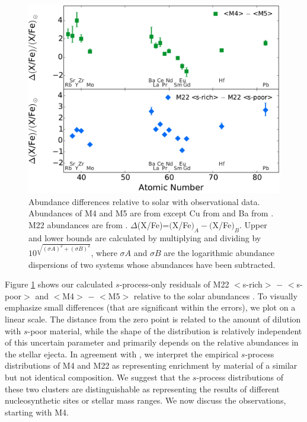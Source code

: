 \begin{figure}
 \begin{center}\includegraphics[width=\textwidth]{f3.pdf}\end{center}
 \caption{Abundance differences relative to solar with observational data. Abundances of M4 and M5 are from \citet{Yong:2008in,Yong:2008ib} except Cu from \citet{Simmerer:2003kg} and Ba from \citet{Ivans:2001ju}. M22 abundances are from \citet{Roederer:2011hw}. $\Delta$(X/Fe)=$($X/Fe$)_A - ($X/Fe$)_B$. Upper and lower bounds are calculated by multiplying and dividing by $10^{\sqrt{(\sigma A)^2+(\sigma B)^2}}$, where $\sigma A$ and $\sigma B$ are the logarithmic abundance dispersions of two systems whose abundances have been subtracted.}
 \label{fig:observations}
\end{figure}

Figure \ref{fig:observations} shows our calculated $s$-process-only residuals of M22 $<$s-rich$>$ $-$ $<$s-poor$>$ and $<$M4$>$ $-$ $<$M5$>$ relative to the solar abundances \citep{Asplund:2009eu}. To visually emphasize small differences (that are significant within the errors), we plot on a linear scale. The distance from the zero point is related to the amount of dilution with $s$-poor material, while the shape of the distribution is relatively independent of this uncertain parameter and primarily depends on the relative abundances in the stellar ejecta. In agreement with \citet{Roederer:2011hw}, we interpret the empirical $s$-process distributions of M4 and M22 as representing enrichment by material of a similar but not identical composition. We suggest that the $s$-process distributions of these two clusters are distinguishable as representing the results of different nucleosynthetic sites or stellar mass ranges. We now discuss the observations, starting with M4.


